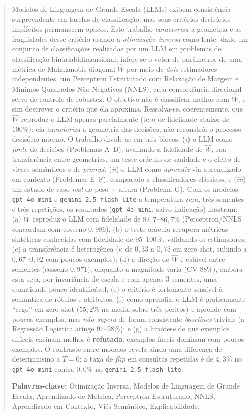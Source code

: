 \documentclass[12pt,a4paper]{article}
\makeatletter
\newcommand{\West}{\ensuremath{\hat{W}}}   %
\providecommand{\DIFdeltex}[1]{{\protect\color{red}\sout{#1}}} %
\providecommand{\DIFdelbegin}{} %
\providecommand{\DIFdelend}{} %
\providecommand{\DIFdel}[1]{\texorpdfstring{\DIFdeltex{#1}}{}} %
\providecommand{\DIFscaledelfig}{0.5}
\newlength{\DIFdelgraphicswidth} %
\newlength{\DIFdelgraphicsheight} %
\providecommand{\DIFdelincludegraphics}[2][]{%
\sbox{\DIFdelgraphicsbox}{\DIFOincludegraphics[#1]{#2}}%
\settoboxwidth{\DIFdelgraphicswidth}{\DIFdelgraphicsbox} %
\settoboxtotalheight{\DIFdelgraphicsheight}{\DIFdelgraphicsbox} %
\scalebox{\DIFscaledelfig}{%
\parbox[b]{\DIFdelgraphicswidth}{\usebox{\DIFdelgraphicsbox}\\[-\baselineskip] \rule{\DIFdelgraphicswidth}{0em}}\llap{\resizebox{\DIFdelgraphicswidth}{\DIFdelgraphicsheight}{%
\setlength{\unitlength}{\DIFdelgraphicswidth}%
\begin{picture}(1,1)%
\thicklines\linethickness{2pt} %
{\color[rgb]{1,0,0}\put(0,0){\framebox(1,1){}}}%
{\color[rgb]{1,0,0}\put(0,0){\line( 1,1){1}}}%
{\color[rgb]{1,0,0}\put(0,1){\line(1,-1){1}}}%
\end{picture}%
}\hspace*{3pt}}} %
} %
\DeclareRobustCommand{\DIFdelbegin}{\DIFOdelbegin \let\includegraphics\DIFdelincludegraphics} %
\DeclareRobustCommand{\DIFdelend}{\DIFOaddend \let\includegraphics\DIFOincludegraphics} %
\let\sout@orig\sout %
\renewcommand{\sout}[1]{\ifmmode\text{\sout@orig{\ensuremath{#1}}}\else\sout@orig{#1}\fi} %
\makeatother
\begin{document}
\begin{abstract}
Modelos de Linguagem de Grande Escala (LLMs) exibem consistência surpreendente em
tarefas de classificação, mas seus critérios decisórios implícitos permanecem opacos.
Este trabalho \emph{caracteriza} a geometria e as fragilidades desse critério usando a
\emph{otimização inversa} como lente: dado um conjunto de classificações realizadas
por um LLM em problemas de classificação binária\DIFdelbegin \DIFdel{bidimensional}\DIFdelend , infere-se o vetor de
parâmetros de uma métrica de
Mahalanobis diagonal \West{} por meio de \emph{dois} estimadores independentes, um
Perceptron Estruturado com Relaxação de Margem e Mínimos Quadrados Não-Negativos (NNLS),
cuja concordância direcional serve de controle de robustez. O objetivo não é classificar
melhor com \West{}, e sim descrever o critério que ela aproxima. Ressalva-se, coerentemente,
que \West{} reproduz o LLM apenas parcialmente (teto de fidelidade abaixo de $100\%$): ela
\emph{caracteriza} a geometria das decisões, não reconstrói o processo decisório interno. O trabalho divide-se em
três blocos: (\emph{i}) o LLM como \emph{fonte} de decisões (Problemas A–D), avaliando a
fidelidade de \West{}, sua transferência entre geometrias, um teste-oráculo de sanidade e
o efeito de vieses semânticos e de \emph{prompt}; (\emph{ii}) o LLM como \emph{aprendiz}
via aprendizado em contexto (Problemas E–F), comparado a classificadores clássicos;
e (\emph{iii}) um estudo de caso \emph{real} de peso $\times$ altura (Problema G).
Com os modelos \texttt{gpt-4o-mini} e \texttt{gemini-2.5-flash-lite} a temperatura zero,
três sementes e três repetições,
os resultados (\texttt{gpt-4o-mini}, salvo indicação) mostram: (a) \West{} reproduz o LLM
com fidelidade de $82{,}7$–$86{,}7\%$
(Perceptron/NNLS concordam com cosseno $0{,}986$); (b) o teste-oráculo recupera métricas
sintéticas conhecidas com fidelidade de $95$–$100\%$, validando os estimadores; (c) a
transferência é heterogênea ($\kappa$ de $0{,}33$ a $0{,}75$ em zero-shot, subindo a
$0{,}67$–$0{,}92$ com poucos exemplos); (d) a direção de \West{} é estável entre sementes
(cosseno $0{,}971$), enquanto a magnitude varia (CV $88\%$), embora esta seja, por
invariância de escala e com apenas $3$ sementes, uma quantidade pouco identificável; (e) o
critério é fortemente sensível à semântica de rótulos e atributos; (f) como
aprendiz, o LLM é praticamente ``cego'' em zero-shot ($55{,}2\%$ na média sobre três
peritos)
e aprende com poucos exemplos, mas \emph{não supera} de forma consistente \emph{baselines}
triviais (a Regressão Logística atinge $97$–$98\%$); e (g) a hipótese de que exemplos
difíceis ensinam melhor é
\textbf{refutada}: exemplos fáceis dominam com poucos exemplos. O contraste entre modelos
revela ainda uma diferença de determinismo a $T=0$: a taxa de \emph{flip} em consultas
repetidas é de $4{,}3\%$ no \texttt{gpt-4o-mini} contra $0{,}0\%$ no
\texttt{gemini-2.5-flash-lite}.

\smallskip\noindent\textbf{Palavras-chave:}
Otimização Inversa, Modelos de Linguagem de Grande Escala, Aprendizado de Métrica,
Perceptron Estruturado, NNLS, Aprendizado em Contexto, Viés Semântico, Explicabilidade.
\end{abstract}
\end{document}
